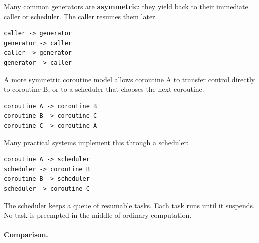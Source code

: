 Many common generators are \textbf{asymmetric}: they yield back to their immediate caller or scheduler. The caller resumes them later.

\begin{verbatim}
caller -> generator
generator -> caller
caller -> generator
generator -> caller
\end{verbatim}

A more symmetric coroutine model allows coroutine A to transfer control directly to coroutine B, or to a scheduler that chooses the next coroutine.

\begin{verbatim}
coroutine A -> coroutine B
coroutine B -> coroutine C
coroutine C -> coroutine A
\end{verbatim}

Many practical systems implement this through a scheduler:

\begin{verbatim}
coroutine A -> scheduler
scheduler -> coroutine B
coroutine B -> scheduler
scheduler -> coroutine C
\end{verbatim}

The scheduler keeps a queue of resumable tasks. Each task runs until it suspends. No task is preempted in the middle of ordinary computation.

\paragraph{Comparison.}

